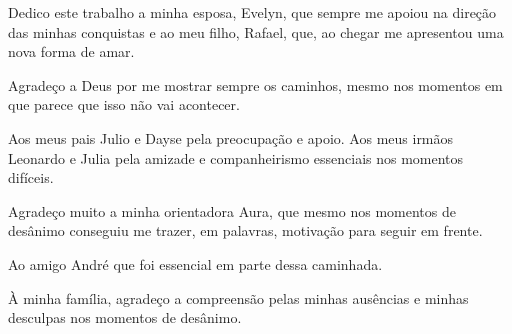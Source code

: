 \cleardoublepage
\thispagestyle{empty}
\vspace*{200mm}

\begin{flushright}
{\em 
    
    Dedico este trabalho a minha esposa, Evelyn, que sempre me apoiou na direção das minhas conquistas e ao meu filho, Rafael, que, ao chegar me apresentou uma nova forma de amar.
}
\end{flushright}
\newpage


\hspace{5mm}
Agradeço a Deus por me mostrar sempre os caminhos, mesmo nos momentos em que parece que isso não vai acontecer. 

Aos meus pais Julio e Dayse pela preocupação e apoio. Aos meus irmãos Leonardo e Julia pela amizade e companheirismo essenciais nos momentos difíceis.

Agradeço muito a minha orientadora Aura, que mesmo nos momentos de desânimo conseguiu me trazer, em palavras, motivação para seguir em frente.

Ao amigo André que foi essencial em parte dessa caminhada.

À minha família, agradeço a compreensão pelas minhas ausências e minhas desculpas nos momentos de desânimo.



